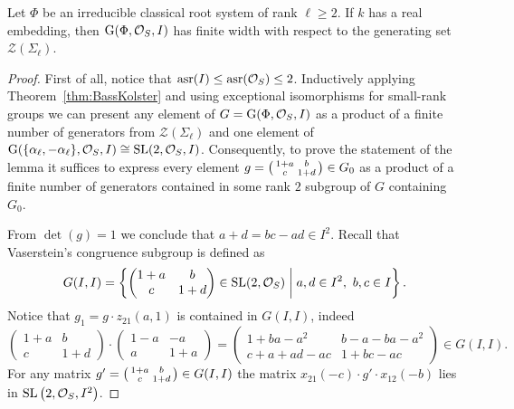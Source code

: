 \begin{lemma}\label{lemma:width-dedekind}
Let $\Phi$ be an irreducible classical root system of rank $\ell \geqslant 2$.
If $k$ has a real embedding, then $\operatorname{G}(\Phi,\mathcal{O}_S,I)$ has finite width with respect to the generating set $\mathcal{Z}(\Sigma_\ell)$.
\end{lemma}
\begin{proof}
First of all, notice that $\operatorname{asr}(I) \leq \operatorname{asr}(\mathcal{O}_S) \leq 2$. 
Inductively applying Theorem~\ref{thm:BassKolster} and using exceptional isomorphisms for small-rank groups we can present any element 
of $G=\operatorname{G}(\Phi, \mathcal{O}_S, I)$ as a product of a finite number of generators from $\mathcal{Z}(\Sigma_\ell)$ and one element of 
$\operatorname{G}(\{\alpha_\ell, -\alpha_\ell\}, \mathcal{O}_S, I)\cong\operatorname{SL}(2,\mathcal{O}_S,I)$.
Consequently, to prove the statement of the lemma it suffices to express every element 
$g = \begin{psmallmatrix}1+a & b \\ c & 1+d \end{psmallmatrix} \in G_0$
as a product of a finite number of generators contained in some rank $2$ subgroup of $G$ containing $G_0$.

From $\det(g)=1$ we conclude that $a+d=bc-ad\in I^2$. 
Recall that Vaserstein's congruence subgroup is defined as
\[ G(I,I)=\left\{ \begin{pmatrix}1+a & b \\ c & 1+d\end{pmatrix}\in\SL(2,\mathcal{O}_S)\;\middle|\; a,d\in I^2,\ b,c\in I \right\}. \]
Notice that $g_1=g\cdot z_{21}(a,1)$ is contained in $G(I,I)$, indeed
\[ \begin{pmatrix} 1+a & b \\ c & 1+d \end{pmatrix} \cdot \begin{pmatrix} 1-a & -a \\ a & 1+a \end{pmatrix} = \begin{pmatrix} 1+ba-a^2 & b-a-ba-a^2 \\ c+a+ad-ac & 1+bc-ac \end{pmatrix} \in G(I,I). \]
For any matrix $g'=\begin{psmallmatrix}1+a & b \\ c & 1+d\end{psmallmatrix}\in G(I,I)$ the matrix $x_{21}(-c)\cdot g'\cdot x_{12}(-b)$ lies in $\operatorname{SL}\left(2,\mathcal{O}_S,I^2\right)$.


\end{proof}
